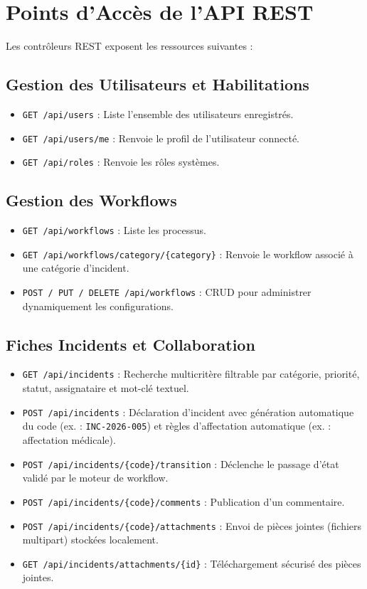 \documentclass[12pt,a4paper]{article}
\begin{document}
\section{Points d'Accès de l'API REST}
Les contrôleurs REST exposent les ressources suivantes :

\subsection{Gestion des Utilisateurs et Habilitations}
\begin{itemize}
    \item \texttt{GET /api/users} : Liste l'ensemble des utilisateurs enregistrés.
    \item \texttt{GET /api/users/me} : Renvoie le profil de l'utilisateur connecté.
    \item \texttt{GET /api/roles} : Renvoie les rôles systèmes.
\end{itemize}

\subsection{Gestion des Workflows}
\begin{itemize}
    \item \texttt{GET /api/workflows} : Liste les processus.
    \item \texttt{GET /api/workflows/category/\{category\}} : Renvoie le workflow associé à une catégorie d'incident.
    \item \texttt{POST / PUT / DELETE /api/workflows} : CRUD pour administrer dynamiquement les configurations.
\end{itemize}

\subsection{Fiches Incidents et Collaboration}
\begin{itemize}
    \item \texttt{GET /api/incidents} : Recherche multicritère filtrable par catégorie, priorité, statut, assignataire et mot-clé textuel.
    \item \texttt{POST /api/incidents} : Déclaration d'incident avec génération automatique du code (ex. : \texttt{INC-2026-005}) et règles d'affectation automatique (ex. : affectation médicale).
    \item \texttt{POST /api/incidents/\{code\}/transition} : Déclenche le passage d'état validé par le moteur de workflow.
    \item \texttt{POST /api/incidents/\{code\}/comments} : Publication d'un commentaire.
    \item \texttt{POST /api/incidents/\{code\}/attachments} : Envoi de pièces jointes (fichiers multipart) stockées localement.
    \item \texttt{GET /api/incidents/attachments/\{id\}} : Téléchargement sécurisé des pièces jointes.
\end{itemize}
\end{document}
